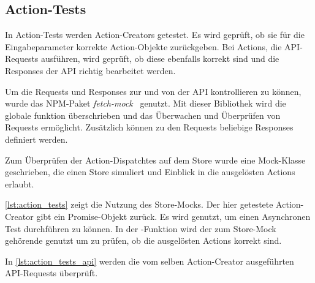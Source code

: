 \subsection{Action-Tests}
\label{sec:tf_action_tests}

In Action-Tests werden Action-Creators getestet.  Es wird geprüft, ob sie für
die Eingabeparameter korrekte Action-Objekte zurückgeben.  Bei Actions, die
API-Requests ausführen, wird geprüft, ob diese ebenfalls korrekt sind und die
Responses der API richtig bearbeitet werden.

Um die Requests und Responses zur und von der API kontrollieren zu können, wurde
das NPM-Paket \emph{fetch-mock}~\cite{fetch-mock} genutzt.  Mit dieser
Bibliothek wird die globale funktion  überschrieben und das
Überwachen und Überprüfen von Requests ermöglicht.  Zusätzlich können zu den
Requests beliebige Responses definiert werden.

Zum Überprüfen der Action-Dispatchtes auf dem Store wurde eine Mock-Klasse
geschrieben, die einen Store simuliert und Einblick in die ausgelösten Actions
erlaubt.

\cref{lst:action_tests} zeigt die Nutzung des Store-Mocks.  Der hier getestete
Action-Creator  gibt ein Promise-Objekt zurück.  Es wird genutzt, um
einen Asynchronen Test durchführen zu können.  In der -Funktion
wird der zum Store-Mock gehörende  genutzt um zu prüfen,
ob die ausgelösten Actions korrekt sind.



In \cref{lst:action_tests_api} werden die vom selben Action-Creator ausgeführten
API-Requests überprüft.


